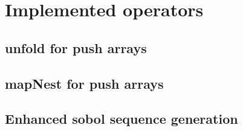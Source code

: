 \section{Implemented operators}
\subsection{unfold for push arrays}
\subsection{mapNest for push arrays}
\subsection{Enhanced sobol sequence generation}

